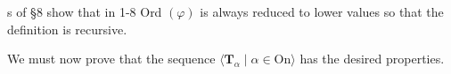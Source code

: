 s of §8 show that in 1-8 Ord $(\varphi)$ is always reduced to lower values so that the definition is recursive.

We must now prove that the sequence $\langle \mathbf{T}_{\alpha} \mid \alpha \in \text{On} \rangle$ has the desired properties.
